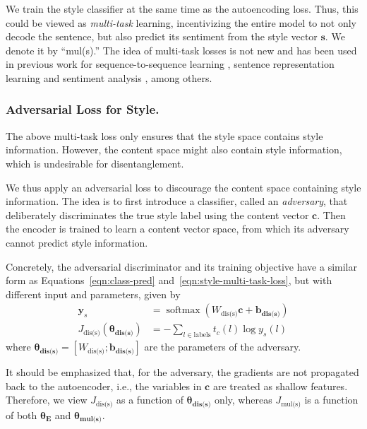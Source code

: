 \documentclass[letterpaper]{article} %
\newcommand{\loss}[1]{J_{\text{#1}}}
\newcommand{\nnweight}[1]{\bm{\theta_{\text{#1}}}}
\newcommand{\weight}[1]{W_{\text{#1}}}
\newcommand{\bias}[1]{\bm{b_{\text{#1}}}}
\begin{document}
We train the style classifier at the same time as the autoencoding loss.
Thus, this could be viewed as \textit{multi-task} learning, incentivizing the entire model to not only decode the sentence, but also predict its sentiment from the style vector $\bm  s$.
We denote it by ``mul(s).''
The idea of multi-task losses is not new and has been used in previous work for sequence-to-sequence learning \cite{luong2015multi}, sentence representation learning \cite{jernite2017discourse} and sentiment analysis \cite{balikas2017multitask}, among others.


\subsubsection{Adversarial Loss for Style.}
\label{ssec:adversarial-style-objective}

The above multi-task loss only ensures that the style space contains style information.
However, the content space might also contain style information, which is undesirable for disentanglement.

We thus apply an adversarial loss to discourage the content space containing style information.
The idea is to first introduce a classifier, called an \textit{adversary}, that deliberately discriminates the true style label using the content vector $\bm c$.
Then the encoder is trained to learn a content vector space, from which its adversary cannot predict style information.

Concretely, the adversarial discriminator and its training objective have a similar form as Equations~\ref{eqn:class-pred} and~\ref{eqn:style-multi-task-loss}, but with different input and parameters, given by
\begin{align}
	\label{eqn:adv-disc-loss}
	\bm y_s                          & = \operatorname{softmax}(\weight{dis(s)} \bm c + \bias{dis(s)}) \\
	\loss{dis(s)}(\nnweight{dis(s)}) & = - \sum\nolimits_{l\in\text{labels}} t_c(l)\log y_s(l)
\end{align}
where $\nnweight{dis(s)}=[\weight{dis(s)}; \bias{dis(s)}]$ are the parameters of the adversary.

It should be emphasized that, for the adversary, the gradients are not propagated back to the autoencoder, i.e., the variables in $\bm c$ are treated as shallow features. Therefore, we view $\loss{dis(s)}$ as a function of $\nnweight{dis(s)}$ only, whereas $\loss{mul(s)}$ is a function of both $\nnweight{E}$ and $\nnweight{mul(s)}$.
\end{document}
